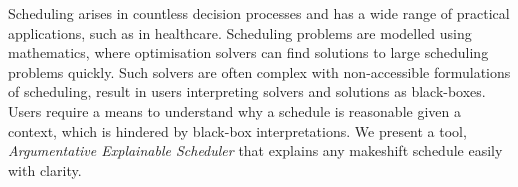Scheduling arises in countless decision processes and has a wide range of practical applications, such as in healthcare. Scheduling problems are modelled using mathematics, where optimisation solvers can find solutions to large scheduling problems quickly. Such solvers are often complex with non-accessible formulations of scheduling, result in users interpreting solvers and solutions as black-boxes. Users require a means to understand why a schedule is reasonable given a context, which is hindered by black-box interpretations.
\linespace
We present a tool, \emph{Argumentative Explainable Scheduler} that explains any makeshift schedule easily with clarity.